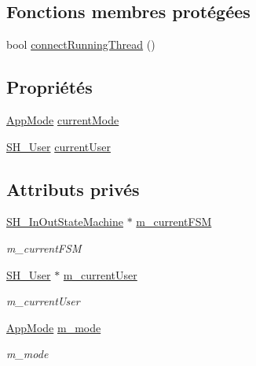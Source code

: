 \subsection*{Fonctions membres protégées}
\begin{DoxyCompactItemize}
\item 
bool \hyperlink{classSH__ApplicationCore_a3a10c2d662707140340d7a827d119c8d}{connect\-Running\-Thread} ()
\end{DoxyCompactItemize}
\subsection*{Propriétés}
\begin{DoxyCompactItemize}
\item 
\hyperlink{classSH__ApplicationCore_a6b93b2f83a290305f282616eb2935899}{App\-Mode} \hyperlink{classSH__ApplicationCore_ac83ee9ad9c649105eb8eac5fac74b951}{current\-Mode}
\item 
\hyperlink{classSH__User}{S\-H\-\_\-\-User} \hyperlink{classSH__ApplicationCore_aaa2609e7bcda83fd65b602e7e211b027}{current\-User}
\end{DoxyCompactItemize}
\subsection*{Attributs privés}
\begin{DoxyCompactItemize}
\item 
\hyperlink{classSH__InOutStateMachine}{S\-H\-\_\-\-In\-Out\-State\-Machine} $\ast$ \hyperlink{classSH__ApplicationCore_a1088f3ba13abb8b3989cc0c325524232}{m\-\_\-current\-F\-S\-M}
\begin{DoxyCompactList}\small\item\em m\-\_\-current\-F\-S\-M \end{DoxyCompactList}\item 
\hyperlink{classSH__User}{S\-H\-\_\-\-User} $\ast$ \hyperlink{classSH__ApplicationCore_aa61720acee7e06e9828c570e8190304a}{m\-\_\-current\-User}
\begin{DoxyCompactList}\small\item\em m\-\_\-current\-User \end{DoxyCompactList}\item 
\hyperlink{classSH__ApplicationCore_a6b93b2f83a290305f282616eb2935899}{App\-Mode} \hyperlink{classSH__ApplicationCore_ac9587a451ab2294abe7a9eb738d93cb0}{m\-\_\-mode}
\begin{DoxyCompactList}\small\item\em m\-\_\-mode \end{DoxyCompactList}\end{DoxyCompactItemize}


